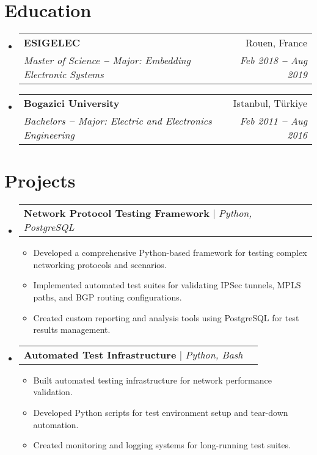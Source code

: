 \documentclass[letterpaper,11pt]{article}
\makeatletter
\newcommand{\resumeItem}[1]{
  \item\small{
    {#1 \vspace{-2pt}}
  }
}
\newcommand{\resumeEducationHeading}[4]{
  \vspace{-2pt}\item
    \begin{tabular*}{0.97\textwidth}[t]{l@{\extracolsep{\fill}}r}
      \textbf{#1} & #2 \\
      \textit{\small#3} & \textit{\small #4} \\
    \end{tabular*}\vspace{-5pt}
}
\newcommand{\resumeProjectHeading}[2]{
    \vspace{-2pt}\item
    \begin{tabular*}{0.97\textwidth}{l@{\extracolsep{\fill}}r}
      \small#1 & #2 \\
    \end{tabular*}\vspace{-7pt}
}
\newcommand{\resumeSubHeadingListStart}{\begin{itemize}[leftmargin=0.15in, label={}]}
\newcommand{\resumeSubHeadingListEnd}{\end{itemize}}
\newcommand{\resumeItemListStart}{\begin{itemize}}
\newcommand{\resumeItemListEnd}{\end{itemize}\vspace{-5pt}}
\makeatother
\begin{document}

\section{Education}
  \vspace{3pt}
  \resumeSubHeadingListStart

    \resumeEducationHeading
      {ESIGELEC}
      {Rouen, France}
      {Master of Science \textbf{--} Major: Embedding Electronic Systems}
      {Feb 2018 \textbf{--} Aug 2019}

    \resumeEducationHeading
      {Bogazici University}
      {Istanbul, Türkiye}
      {Bachelors \textbf{--} Major: Electric and Electronics Engineering}
      {Feb 2011 \textbf{--} Aug 2016}

  \resumeSubHeadingListEnd


\section{Projects}
    \vspace{3pt}
    \resumeSubHeadingListStart

      \resumeProjectHeading
        {\textbf{Network Protocol Testing Framework} $|$ \emph{Python, PostgreSQL}}{}
          \resumeItemListStart
            \resumeItem{
              Developed a comprehensive Python-based framework for testing complex networking protocols and scenarios.
            }
            \resumeItem{
              Implemented automated test suites for validating IPSec tunnels, MPLS paths, and BGP routing configurations.
            }
            \resumeItem{
              Created custom reporting and analysis tools using PostgreSQL for test results management.
            }
          \resumeItemListEnd

      \resumeProjectHeading
        {\textbf{Automated Test Infrastructure} $|$ \emph{Python, Bash}}{}
          \resumeItemListStart
            \resumeItem{
              Built automated testing infrastructure for network performance validation.
            }
            \resumeItem{
              Developed Python scripts for test environment setup and tear-down automation.
            }
            \resumeItem{
              Created monitoring and logging systems for long-running test suites.
            }
          \resumeItemListEnd

    \resumeSubHeadingListEnd
\end{document}
